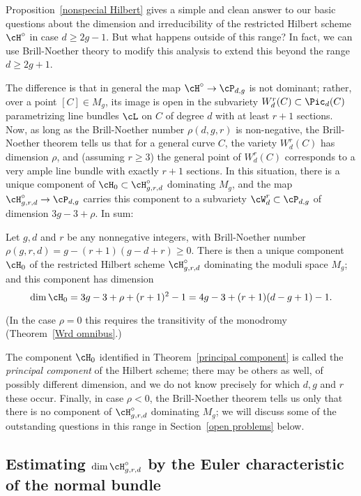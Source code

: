 Proposition~\ref{nonspecial Hilbert} gives a simple and clean answer to our basic questions about the dimension and irreducibility of the restricted Hilbert scheme $\cH^\circ$ in case $d \geq 2g-1$. But what happens outside of this range? In fact, we  can use Brill-Noether theory to modify this analysis to extend this beyond the range $d \geq 2g+1$.

The difference is that in general the map $\cH^\circ \to \cP_{d,g}$ is not dominant; rather, over a point $[C] \in M_g$, its image is open in the subvariety $W^r_d(C) \subset \Pic_d(C)$ parametrizing line bundles $\cL$ on $C$ of degree $d$ with at least $r+1$ sections. Now, as long as the Brill-Noether number $\rho(d,g,r)$ is non-negative, the Brill-Noether theorem tells us that for a general curve $C$, the variety $W^r_d(C)$ has dimension $\rho$, and (assuming $r \geq 3$) the general point of $W^r_d(C)$ corresponds to a very ample line bundle with exactly $r+1$ sections. In this situation, there is a unique component of $\cH_0 \subset \cH^\circ_{g,r,d}$ dominating $M_g$, and the map $\cH^\circ_{g,r,d} \to \cP_{d,g}$ carries this component to a subvariety $\cW^r_d \subset \cP_{d,g}$ of dimension $3g-3 + \rho$. In sum:

\begin{theorem}\label{principal component}
Let $g, d$ and $r$ be any nonnegative integers, with Brill-Noether number  $\rho(g,r,d) = g - (r+1)(g-d+r) \geq 0$. There is then a unique component $\cH_0$ of the restricted Hilbert scheme $\cH^\circ_{g,r,d}$ dominating the moduli space $M_g$; and this component has dimension
$$
\dim \cH_0 = 3g-3+\rho + (r+1)^2 - 1 = 4g-3 + (r+1)(d-g+1) - 1.
$$
\end{theorem}

(In the case $\rho=0$ this requires the transitivity of the monodromy (Theorem~\ref{Wrd omnibus}.) 


 The component $\cH_0$ identified in Theorem~\ref{principal component} is called the \emph{principal component} of the Hilbert scheme; there may be others as well, of possibly different dimension, and we do not know precisely for which $d,g$ and $r$ these occur. Finally, in case $\rho < 0$, the Brill-Noether theorem tells us only that there is no component of $\cH^\circ_{g,r,d}$ dominating $M_g$; we will discuss some of the outstanding questions in this range in Section~\ref{open problems} below. 


\subsection{Estimating $\dim \cH^\circ_{g,r,d}$ by the Euler characteristic of the normal bundle}

